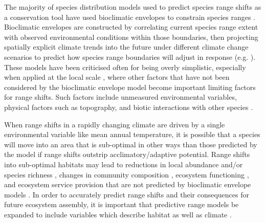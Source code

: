 \documentclass[a4paper, 11pt]{article}
\begin{document}
The majority of species distribution models used to predict species range shifts as a conservation tool have used bioclimatic envelopes to constrain species ranges \citep{Pearson2003, Sinclair2010}. Bioclimatic envelopes are constructed by correlating current species range extent with observed environmental conditions within those boundaries, then projecting spatially explicit climate trends into the future under different climate change scenarios to predict how species range boundaries will adjust in response (e.g. \citealt{Araujo2006, Berry2002, Peterson2002, Thuiller2005}). These models have been criticised often for being overly simplistic, especially when applied at the local scale \citep{McMahon2011}, where other factors that have not been considered by the bioclimatic envelope model become important limiting factors for range shifts. Such factors include unmeasured environmental variables, physical factors such as topography, and biotic interactions with other species \citep{Davis1998, Ettinger2011, Putten2010}.

When range shifts in a rapidly changing climate are driven by a single environmental variable like mean annual temperature, it is possible that a species will move into an area that is sub-optimal in other ways than those predicted by the model if range shifts outstrip acclimatory/adaptive potential. Range shifts into sub-optimal habitats may lead to reductions in local abundance and/or species richness \citep{Colwell2008}, changes in community composition \citep{Gibson-Reinemer2015}, ecosystem functioning \citep{Bellard2012}, and ecosystem service provision that are not predicted by bioclimatic envelope models \citep{Dobson2011, Isbell2011}. In order to accurately predict range shifts and their consequences for future ecosystem assembly, it is important that predictive range models be expanded to include variables which describe habitat as well as climate \citep{Wisz2013}.
\end{document}
